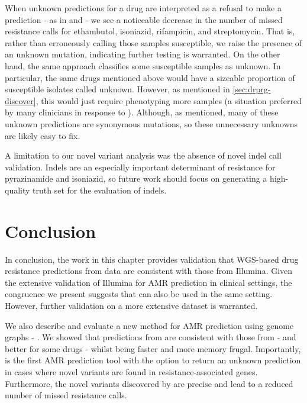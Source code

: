 When unknown predictions for a drug are interpreted as a refusal to make a prediction - as in \cite{cryptic2018} and \cite{hunt2019} - we see a noticeable decrease in the number of missed resistance calls for ethambutol, isoniazid, rifampicin, and streptomycin. That is, rather than erroneously calling those samples susceptible, we raise the presence of an unknown mutation, indicating further testing is warranted. On the other hand, the same approach classifies some susceptible samples as unknown. In particular, the same drugs mentioned above would have a sizeable proportion of susceptible isolates called unknown. However, as mentioned in \autoref{sec:drprg-discover}, this would just require phenotyping more samples (a situation preferred by many clinicians in response to \cite{hunt2019}). Although, as mentioned, many of these unknown predictions are synonymous mutations, so these unnecessary unknowns are likely easy to fix.

A limitation to our novel variant analysis was the absence of novel indel call validation. Indels are an especially important determinant of resistance for pyrazinamide and isoniazid, so future work should focus on generating a high-quality truth set for the evaluation of \drprg{} indels.

\section{Conclusion}
In conclusion, the work in this chapter provides validation that WGS-based drug resistance predictions from \ont{} data are consistent with those from Illumina. Given the extensive validation of Illumina for \mtb{} AMR prediction in clinical settings, the congruence we present suggests that \ont{} can also be used in the same setting. However, further validation on a more extensive dataset is warranted. 

We also describe and evaluate a new method for AMR prediction using genome graphs - \drprg{}. We showed that predictions from \drprg{} are consistent with those from \mykrobe{} - and better for some drugs - whilst being faster and more memory frugal. Importantly, \drprg{} is the first \mtb{} AMR prediction tool with the option to return an unknown prediction in cases where novel variants are found in resistance-associated genes. Furthermore, the novel variants discovered by \drprg{} are precise and lead to a reduced number of missed resistance calls.

